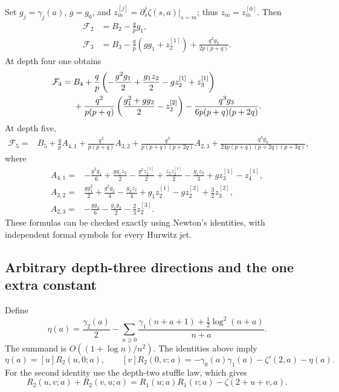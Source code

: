 Set $g_j=\gamma_j(a)$, $g=g_0$, and
$z_m^{[j]}=\partial_s^j\zeta(s,a)|_{s=m}$; thus
$z_m=z_m^{[0]}$. Then
\begin{align}\label{ord:F2}
 \mathcal F_2&=B_2-\frac qp g_1,\\
 \mathcal F_3&=B_3-\frac qp(gg_1+z_2^{[1]})
                  +\frac{q^2g_2}{2p(p+q)}.\label{ord:F3}
\end{align}
At depth four one obtains
\begin{align}\label{ord:F4}
 \mathcal F_4={}&B_4+
 \frac qp\left(-\frac{g^2g_1}{2}+\frac{g_1z_2}{2}
                        -gz_2^{[1]}+z_3^{[1]}\right)\notag\\
 &+\frac{q^2}{p(p+q)}
       \left(\frac{g_1^2+gg_2}{2}-z_2^{[2]}\right)
 -\frac{q^3g_3}{6p(p+q)(p+2q)}.
\end{align}
At depth five,
\begin{align}\label{ord:F5}
 \mathcal F_5={}&B_5+\frac qp A_{4,1}
 +\frac{q^2}{p(p+q)}A_{3,2}
 +\frac{q^3}{p(p+q)(p+2q)}A_{2,3}
 +\frac{q^4g_4}{24p(p+q)(p+2q)(p+3q)},
\end{align}
where
\begin{align*}
 A_{4,1}={}&-\frac{g^3g_1}{6}+\frac{gg_1z_2}{2}
 -\frac{g^2z_2^{[1]}}2+\frac{z_2z_2^{[1]}}2
 -\frac{g_1z_3}{3}+gz_3^{[1]}-z_4^{[1]},\\
 A_{3,2}={}&\frac{gg_1^2}{2}+\frac{g^2g_2}{4}
 -\frac{g_2z_2}{4}+g_1z_2^{[1]}-gz_2^{[2]}
 +\frac32z_3^{[2]},\\
 A_{2,3}={}&-\frac{gg_3}{6}-\frac{g_1g_2}{2}
 -\frac23z_2^{[3]}.
\end{align*}
These formulas can be checked exactly using Newton's identities, with
independent formal symbols for every Hurwitz jet.

\subsection{Arbitrary depth-three directions and the one extra constant}

Define
\begin{equation}\label{ord:etadef}
 \eta(a)=\frac{\gamma_2(a)}2-
 \sum_{n\ge0}\frac{\gamma_1(n+a+1)+\tfrac12\log^2(n+a)}{n+a}.
\end{equation}
The summand is $O((1+\log n)/n^2)$.
The identities above imply
\[
 \eta(a)=[u]R_2(u,0;a),\qquad
 [v]R_2(0,v;a)=-\gamma_0(a)\gamma_1(a)-\zeta'(2,a)-\eta(a).
\]
For the second identity use the depth-two stuffle law, which gives
\[
 R_2(u,v;a)+R_2(v,u;a)
 =R_1(u;a)R_1(v;a)-\zeta(2+u+v,a).
\]

